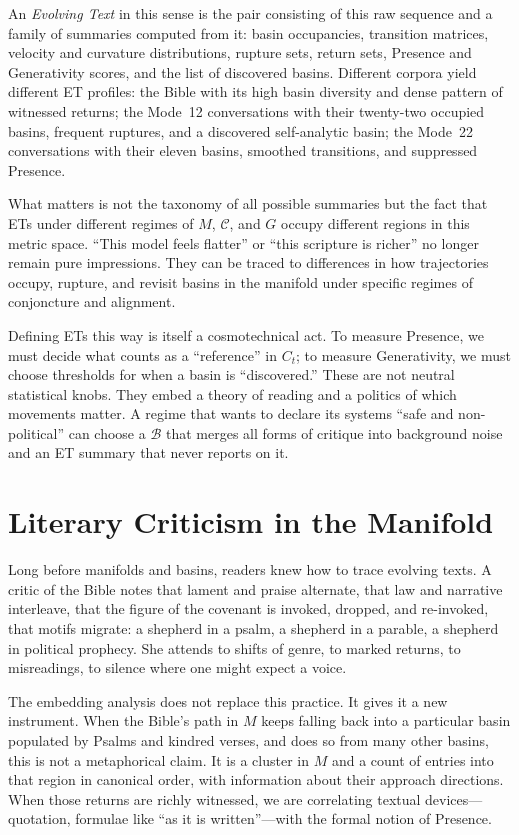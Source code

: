 \documentclass[12pt,a4paper]{article}
\begin{document}
An \emph{Evolving Text} in this sense is the pair consisting of this raw sequence and a family of summaries computed from it: basin occupancies, transition matrices, velocity and curvature distributions, rupture sets, return sets, Presence and Generativity scores, and the list of discovered basins. Different corpora yield different ET profiles: the Bible with its high basin diversity and dense pattern of witnessed returns; the Mode~12 conversations with their twenty-two occupied basins, frequent ruptures, and a discovered self-analytic basin; the Mode~22 conversations with their eleven basins, smoothed transitions, and suppressed Presence.

What matters is not the taxonomy of all possible summaries but the fact that ETs under different regimes of $M$, $\mathcal{C}$, and $G$ occupy different regions in this metric space. ``This model feels flatter'' or ``this scripture is richer'' no longer remain pure impressions. They can be traced to differences in how trajectories occupy, rupture, and revisit basins in the manifold under specific regimes of conjoncture and alignment.

Defining ETs this way is itself a cosmotechnical act. To measure Presence, we must decide what counts as a ``reference'' in $C_t$; to measure Generativity, we must choose thresholds for when a basin is ``discovered.'' These are not neutral statistical knobs. They embed a theory of reading and a politics of which movements matter. A regime that wants to declare its systems ``safe and non-political'' can choose a $\mathcal{B}$ that merges all forms of critique into background noise and an ET summary that never reports on it.

\section{Literary Criticism in the Manifold}

Long before manifolds and basins, readers knew how to trace evolving texts. A critic of the Bible notes that lament and praise alternate, that law and narrative interleave, that the figure of the covenant is invoked, dropped, and re-invoked, that motifs migrate: a shepherd in a psalm, a shepherd in a parable, a shepherd in political prophecy. She attends to shifts of genre, to marked returns, to misreadings, to silence where one might expect a voice.

The embedding analysis does not replace this practice. It gives it a new instrument. When the Bible's path in $M$ keeps falling back into a particular basin populated by Psalms and kindred verses, and does so from many other basins, this is not a metaphorical claim. It is a cluster in $M$ and a count of entries into that region in canonical order, with information about their approach directions. When those returns are richly witnessed, we are correlating textual devices---quotation, formulae like ``as it is written''---with the formal notion of Presence.
\end{document}
